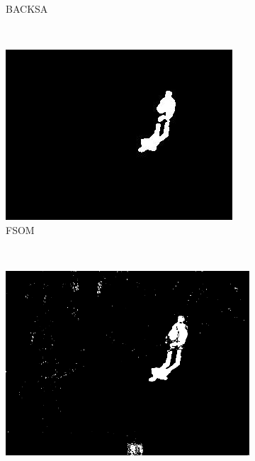 \begin{figure}[t]
\begin{subfigure}[b]{0.19\textwidth}
                \caption{BACKSA}
                \label{fig:cp02_backsaMask}
        \end{subfigure}%
        ~ %
        \begin{subfigure}[b]{0.19\textwidth}
                \centering
                \includegraphics[width=\textwidth]{fig15.jpg}
                \caption{FSOM}
                \label{fig:cp02_fsomMask}
        \end{subfigure}%
        ~ %
        \begin{subfigure}[b]{0.19\textwidth}
                \centering
                \includegraphics[width=\textwidth]{fig16.jpg}

\end{subfigure}
\end{figure}
